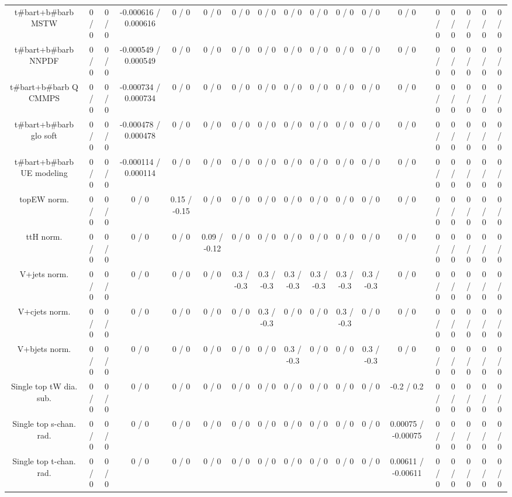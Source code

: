\documentclass[10pt]{article}
\begin{document}
\begin{table}[htbp]
\begin{center}
\begin{tabular}{|c|c|c|c|c|c|c|c|c|c|c|c|c|c|c|c|c|c|}
  t#bar{t}+b#bar{b} MSTW & 0 / 0 & 0 / 0 & -0.000616 / 0.000616 & 0 / 0 & 0 / 0 & 0 / 0 & 0 / 0 & 0 / 0 & 0 / 0 & 0 / 0 & 0 / 0 & 0 / 0 & 0 / 0 & 0 / 0 & 0 / 0 & 0 / 0 & 0 / 0 \\ 
  t#bar{t}+b#bar{b} NNPDF & 0 / 0 & 0 / 0 & -0.000549 / 0.000549 & 0 / 0 & 0 / 0 & 0 / 0 & 0 / 0 & 0 / 0 & 0 / 0 & 0 / 0 & 0 / 0 & 0 / 0 & 0 / 0 & 0 / 0 & 0 / 0 & 0 / 0 & 0 / 0 \\ 
  t#bar{t}+b#bar{b} Q CMMPS & 0 / 0 & 0 / 0 & -0.000734 / 0.000734 & 0 / 0 & 0 / 0 & 0 / 0 & 0 / 0 & 0 / 0 & 0 / 0 & 0 / 0 & 0 / 0 & 0 / 0 & 0 / 0 & 0 / 0 & 0 / 0 & 0 / 0 & 0 / 0 \\ 
  t#bar{t}+b#bar{b} glo soft & 0 / 0 & 0 / 0 & -0.000478 / 0.000478 & 0 / 0 & 0 / 0 & 0 / 0 & 0 / 0 & 0 / 0 & 0 / 0 & 0 / 0 & 0 / 0 & 0 / 0 & 0 / 0 & 0 / 0 & 0 / 0 & 0 / 0 & 0 / 0 \\ 
  t#bar{t}+b#bar{b} UE modeling & 0 / 0 & 0 / 0 & -0.000114 / 0.000114 & 0 / 0 & 0 / 0 & 0 / 0 & 0 / 0 & 0 / 0 & 0 / 0 & 0 / 0 & 0 / 0 & 0 / 0 & 0 / 0 & 0 / 0 & 0 / 0 & 0 / 0 & 0 / 0 \\ 
  topEW norm. & 0 / 0 & 0 / 0 & 0 / 0 & 0.15 / -0.15 & 0 / 0 & 0 / 0 & 0 / 0 & 0 / 0 & 0 / 0 & 0 / 0 & 0 / 0 & 0 / 0 & 0 / 0 & 0 / 0 & 0 / 0 & 0 / 0 & 0 / 0 \\ 
  ttH norm. & 0 / 0 & 0 / 0 & 0 / 0 & 0 / 0 & 0.09 / -0.12 & 0 / 0 & 0 / 0 & 0 / 0 & 0 / 0 & 0 / 0 & 0 / 0 & 0 / 0 & 0 / 0 & 0 / 0 & 0 / 0 & 0 / 0 & 0 / 0 \\ 
  V+jets norm. & 0 / 0 & 0 / 0 & 0 / 0 & 0 / 0 & 0 / 0 & 0.3 / -0.3 & 0.3 / -0.3 & 0.3 / -0.3 & 0.3 / -0.3 & 0.3 / -0.3 & 0.3 / -0.3 & 0 / 0 & 0 / 0 & 0 / 0 & 0 / 0 & 0 / 0 & 0 / 0 \\ 
  V+cjets norm. & 0 / 0 & 0 / 0 & 0 / 0 & 0 / 0 & 0 / 0 & 0 / 0 & 0.3 / -0.3 & 0 / 0 & 0 / 0 & 0.3 / -0.3 & 0 / 0 & 0 / 0 & 0 / 0 & 0 / 0 & 0 / 0 & 0 / 0 & 0 / 0 \\ 
  V+bjets norm. & 0 / 0 & 0 / 0 & 0 / 0 & 0 / 0 & 0 / 0 & 0 / 0 & 0 / 0 & 0.3 / -0.3 & 0 / 0 & 0 / 0 & 0.3 / -0.3 & 0 / 0 & 0 / 0 & 0 / 0 & 0 / 0 & 0 / 0 & 0 / 0 \\ 
  Single top tW dia. sub. & 0 / 0 & 0 / 0 & 0 / 0 & 0 / 0 & 0 / 0 & 0 / 0 & 0 / 0 & 0 / 0 & 0 / 0 & 0 / 0 & 0 / 0 & -0.2 / 0.2 & 0 / 0 & 0 / 0 & 0 / 0 & 0 / 0 & 0 / 0 \\ 
  Single top s-chan. rad. & 0 / 0 & 0 / 0 & 0 / 0 & 0 / 0 & 0 / 0 & 0 / 0 & 0 / 0 & 0 / 0 & 0 / 0 & 0 / 0 & 0 / 0 & 0.00075 / -0.00075 & 0 / 0 & 0 / 0 & 0 / 0 & 0 / 0 & 0 / 0 \\ 
  Single top t-chan. rad. & 0 / 0 & 0 / 0 & 0 / 0 & 0 / 0 & 0 / 0 & 0 / 0 & 0 / 0 & 0 / 0 & 0 / 0 & 0 / 0 & 0 / 0 & 0.00611 / -0.00611 & 0 / 0 & 0 / 0 & 0 / 0 & 0 / 0 & 0 / 0 \\ 

\end{tabular}
\end{center}
\end{table}
\end{document}
